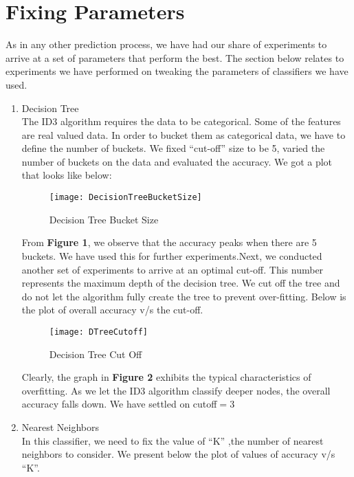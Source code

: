 \documentclass{article}
\begin{document}
\section{Fixing Parameters}

As in any other prediction process, we have had our share of experiments to arrive at a set of parameters that perform the best. The section below relates to experiments we have performed on tweaking the parameters of classifiers we have used.

\begin{enumerate}
\item Decision Tree\\
The ID3 algorithm requires the data to be categorical. Some of the features are real valued data. In order to bucket them as categorical data, we have to define the number of buckets. We fixed “cut-off” size to be 5, varied the number of buckets on the data and evaluated the accuracy. We got a plot that looks like below:

\begin{figure}[h]
      \centering
    \texttt{[image: DecisionTreeBucketSize]}
    \caption{Decision Tree Bucket Size}
\end{figure}



From \textbf{Figure 1}, we observe that the accuracy peaks when there are 5 buckets. We have used this for further experiments.Next, we conducted another set of experiments to arrive at an optimal cut-off. This number represents the maximum depth of the decision tree. We cut off the tree and do not let the algorithm fully create the tree to prevent over-fitting. Below is the plot of overall accuracy v/s the cut-off.
\begin{figure}[h]
      \centering
    \texttt{[image: DTreeCutoff]}
    \caption{Decision Tree Cut Off}
\end{figure}
Clearly, the graph in \textbf{Figure 2} exhibits the typical characteristics of overfitting. As we let the ID3 algorithm classify deeper nodes, the overall accuracy falls down. We have settled on cutoff$=$3


\item Nearest Neighbors\\
In this classifier, we need to fix the value of “K” ,the number of nearest neighbors to consider. We present below the plot of values of accuracy v/s “K”.

\end{enumerate}
\end{document}
